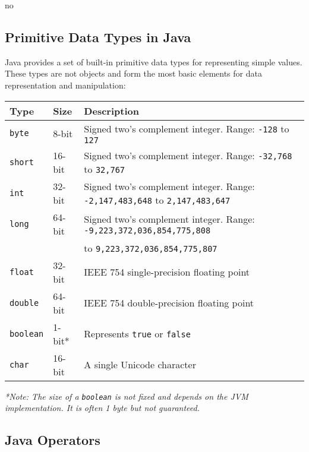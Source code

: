 no\documentclass{article}
\begin{document}
\subsection{Primitive Data Types in Java}
Java provides a set of built-in primitive data types for representing simple values. These types are not objects and form the most basic elements for data representation and manipulation:

\begin{table}[h!]
\centering
\begin{tabular}{@{}lll@{}}
\toprule
\textbf{Type} & \textbf{Size} & \textbf{Description} \\
\midrule
\texttt{byte}   & 8-bit   & Signed two’s complement integer. Range: \texttt{-128} to \texttt{127} \\
\texttt{short}  & 16-bit  & Signed two’s complement integer. Range: \texttt{-32,768} to \texttt{32,767} \\
\texttt{int}    & 32-bit  & Signed two’s complement integer. Range: \texttt{-2,147,483,648} to \texttt{2,147,483,647} \\
\texttt{long}   & 64-bit  & Signed two’s complement integer. Range: \texttt{-9,223,372,036,854,775,808} \\
                &         & to \texttt{9,223,372,036,854,775,807} \\
\texttt{float}  & 32-bit  & IEEE 754 single-precision floating point \\
\texttt{double} & 64-bit  & IEEE 754 double-precision floating point \\
\texttt{boolean}& 1-bit*  & Represents \texttt{true} or \texttt{false} \\
\texttt{char}   & 16-bit  & A single Unicode character \\
\bottomrule
\end{tabular}
\end{table}
\textit{*Note: The size of a \texttt{boolean} is not fixed and depends on the JVM implementation. It is often 1 byte but not guaranteed.}

\subsection{Java Operators}
\end{document}

